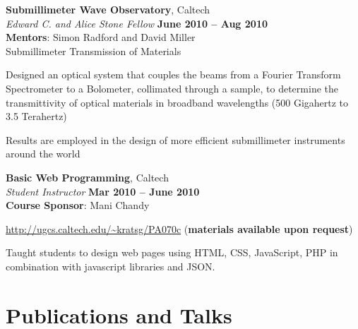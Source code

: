 \documentclass[margin,line]{resume}
\let\origsection\section%
\let\section\subsection%
\let\section\origsection%
\begin{document}
\begin{resume}
    \textbf{Submillimeter Wave Observatory}, Caltech \vspace{2mm}\\\vspace{1mm}%
    \textsl{Edward C. and Alice Stone Fellow} \hfill \textbf{June 2010 -- Aug 2010}\\
    \textbf{Mentors}: Simon Radford and David Miller\\
	Submillimeter Transmission of Materials\vspace{-3mm}\\\vspace{-1mm}%
	\begin{list2}
		\item Designed an optical system that couples the beams from a Fourier Transform Spectrometer to a Bolometer, collimated through a sample, to determine the transmittivity of optical materials in broadband wavelengths (500 Gigahertz to 3.5 Terahertz)
		\item Results are employed in the design of more efficient submillimeter instruments around the world
	\end{list2}

    \textbf{Basic Web Programming}, Caltech \vspace{2mm}\\\vspace{1mm}%
    \textsl{Student Instructor} \hfill \textbf{Mar 2010 -- June 2010}\\
    \textbf{Course Sponsor}: Mani Chandy\vspace{-3mm}\\\vspace{-1mm}%
    \begin{list2}
		\item \url{http://ugcs.caltech.edu/~kratsg/PA070c} (\textbf{materials available upon request})
		\item Taught students to design web pages using HTML, CSS, JavaScript, PHP in combination with javascript libraries and JSON.
	\end{list2}

    \pagebreak

\section{\mysidestyle Publications and Talks}


\end{resume}
\end{document}
